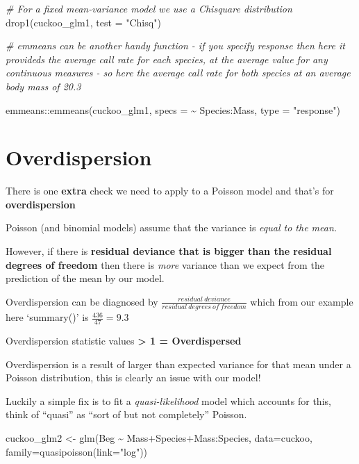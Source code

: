 \documentclass[
]{book}
\newenvironment{Shaded}{\begin{snugshade}}{\end{snugshade}}
\newcommand{\AttributeTok}[1]{\textcolor[rgb]{0.77,0.63,0.00}{#1}}
\newcommand{\CommentTok}[1]{\textcolor[rgb]{0.56,0.35,0.01}{\textit{#1}}}
\newcommand{\FunctionTok}[1]{\textcolor[rgb]{0.00,0.00,0.00}{#1}}
\newcommand{\NormalTok}[1]{#1}
\newcommand{\OtherTok}[1]{\textcolor[rgb]{0.56,0.35,0.01}{#1}}
\newcommand{\SpecialCharTok}[1]{\textcolor[rgb]{0.00,0.00,0.00}{#1}}
\newcommand{\StringTok}[1]{\textcolor[rgb]{0.31,0.60,0.02}{#1}}
\begin{document}
\begin{Shaded}
\begin{Highlighting}[]
\CommentTok{\# For a fixed  mean{-}variance model we use a Chisquare distribution}
\FunctionTok{drop1}\NormalTok{(cuckoo\_glm1, }\AttributeTok{test =} \StringTok{"Chisq"}\NormalTok{)}

\CommentTok{\# emmeans can be another handy function {-} if you specify response then here it provideds the average call rate for each species, at the average value for any continuous measures {-} so here the average call rate for both species at an average body mass of 20.3}

\NormalTok{emmeans}\SpecialCharTok{::}\FunctionTok{emmeans}\NormalTok{(cuckoo\_glm1, }\AttributeTok{specs =} \SpecialCharTok{\textasciitilde{}}\NormalTok{ Species}\SpecialCharTok{:}\NormalTok{Mass, }\AttributeTok{type =} \StringTok{"response"}\NormalTok{)}
\end{Highlighting}
\end{Shaded}

\hypertarget{overdispersion}{%
\section{Overdispersion}\label{overdispersion}}

There is one \textbf{extra} check we need to apply to a Poisson model and that's for \textbf{overdispersion}

Poisson (and binomial models) assume that the variance is \emph{equal to the mean.}

However, if there is \textbf{residual deviance that is bigger than the residual degrees of freedom} then there is \emph{more} variance than we expect from the prediction of the mean by our model.

Overdispersion can be diagnosed by \(\frac{residual~deviance}{residual~degrees~of~freedom}\) which from our example here `summary()' is \(\frac{436}{47} = 9.3\)

Overdispersion statistic values \textbf{\textgreater{} 1 = Overdispersed}

Overdispersion is a result of larger than expected variance for that mean under a Poisson distribution, this is clearly an issue with our model!

Luckily a simple fix is to fit a \emph{quasi-likelihood} model which accounts for this, think of ``quasi'' as ``sort of but not completely'' Poisson.

\begin{Shaded}
\begin{Highlighting}[]
\NormalTok{cuckoo\_glm2 }\OtherTok{\textless{}{-}} \FunctionTok{glm}\NormalTok{(Beg }\SpecialCharTok{\textasciitilde{}}\NormalTok{ Mass}\SpecialCharTok{+}\NormalTok{Species}\SpecialCharTok{+}\NormalTok{Mass}\SpecialCharTok{:}\NormalTok{Species, }\AttributeTok{data=}\NormalTok{cuckoo, }\AttributeTok{family=}\FunctionTok{quasipoisson}\NormalTok{(}\AttributeTok{link=}\StringTok{"log"}\NormalTok{))}
\end{Highlighting}
\end{Shaded}
\end{document}
